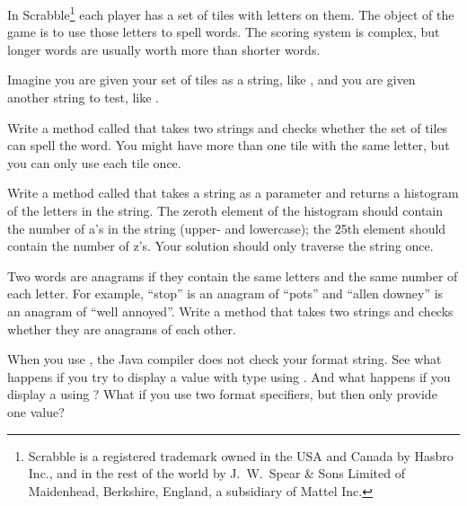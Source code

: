 \begin{exercise}  %


In Scrabble\footnote{Scrabble is a registered trademark owned in the USA and Canada by Hasbro Inc., and in the rest of the world by J.\ W.\ Spear \& Sons Limited of Maidenhead, Berkshire, England, a subsidiary of Mattel Inc.} each player has a set of tiles with letters on them.
The object of the game is to use those letters to spell words.
The scoring system is complex, but longer words are usually worth more than shorter words.

Imagine you are given your set of tiles as a string, like , and you are given another string to test, like .

Write a method called  that takes two strings and checks whether the set of tiles can spell the word.
You might have more than one tile with the same letter, but you can only use each tile once.

\end{exercise}

\begin{exercise}  %
	
	Write a method called  that takes a string as a parameter and returns a histogram of the letters in the string.
	The zeroth element of the histogram should contain the number of a's in the string (upper- and lowercase); the 25th element should contain the number of z's.
	Your solution should only traverse the string once.
	
\end{exercise}


\begin{exercise}  %
	
	
	Two words are anagrams if they contain the same letters and the same number of each letter.
	For example, ``stop'' is an anagram of ``pots'' and ``allen downey'' is an anagram of ``well annoyed''.
	Write a method that takes two strings and checks whether they are anagrams of each other.
	
\end{exercise}

\begin{exercise}  %

When you use , the Java compiler does not check your format string.
See what happens if you try to display a value with type  using .
And what happens if you display a  using ?
What if you use two format specifiers, but then only provide one value?

\end{exercise}

